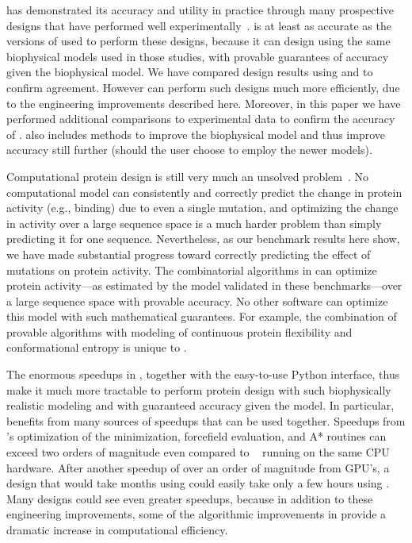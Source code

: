 \osprey has demonstrated its accuracy and utility in practice through many prospective designs that have performed well experimentally~\cite{VRC07_enhance,CFTR,runx1_cbfb,GrsA-LeuA,DHFR-PNAS,GrsA-TyrA,specific_probes}.   is at least as accurate as the versions of \osprey used to perform these designs, because it can design using the same biophysical models used in those studies, with provable guarantees of accuracy given the biophysical model.  We have compared design results using  and  to confirm agreement.  However  can perform such designs much more efficiently, due to the engineering improvements described here.  Moreover, in this paper we have performed additional comparisons to experimental data to confirm the accuracy of .   also includes methods to improve the biophysical model and thus improve accuracy still further (should the user choose to employ the newer models). 

Computational protein design is still very much an unsolved problem~\cite{alg_SMB_textbook,cosb_design}.  No computational model can consistently and correctly predict the change in protein activity (e.g., binding) due to even a single mutation, and optimizing the change in activity over a large sequence space is a much harder problem than simply predicting it for one sequence.  Nevertheless, as our benchmark results here show, we have made substantial progress toward correctly predicting the effect of mutations on protein activity.  The combinatorial algorithms in \osprey can optimize protein activity---as estimated by the model validated in these benchmarks---over a large sequence space with provable accuracy.  No other software can optimize this model with such mathematical guarantees.  For example, the combination of provable algorithms with modeling of continuous protein flexibility and conformational entropy is unique to \osprey.   

The enormous speedups in , together with the easy-to-use Python interface, thus make it much more tractable to perform protein design with such biophysically realistic modeling and with guaranteed accuracy given the model.  In particular,  benefits from many sources of speedups that can be used together.  Speedups from 's optimization of the minimization, forcefield evaluation, and A* routines can exceed two orders of magnitude even compared to ~\cite{COMETS} running on the same CPU hardware.  After another speedup of over an order of magnitude from GPU's, a design that would take months using  could easily take only a few hours using .  Many designs could see even greater speedups, because in addition to these engineering improvements, some of the algorithmic improvements in  provide a dramatic increase in computational efficiency.  

